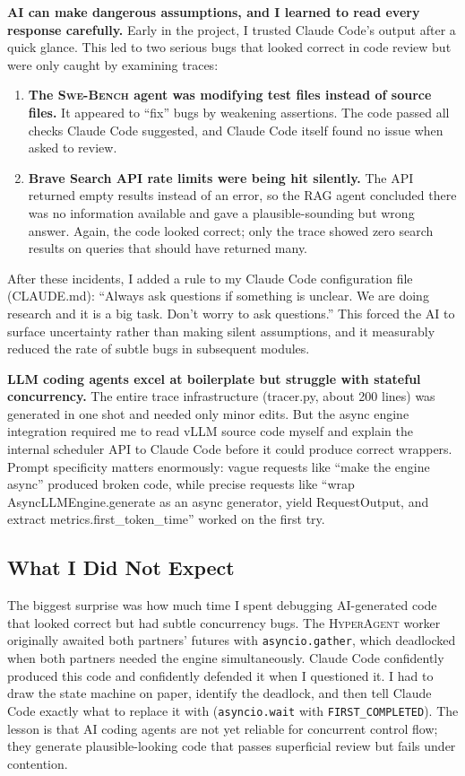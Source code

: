 \documentclass[10pt,twocolumn]{article}
\begin{document}
\textbf{AI can make dangerous assumptions, and I learned to read every response carefully.} Early in the project, I trusted Claude Code's output after a quick glance. This led to two serious bugs that looked correct in code review but were only caught by examining traces:

\begin{enumerate}[nosep,leftmargin=*]
\item \textbf{The \textsc{Swe-Bench} agent was modifying test files instead of source files.} It appeared to ``fix'' bugs by weakening assertions. The code passed all checks Claude Code suggested, and Claude Code itself found no issue when asked to review.
\item \textbf{Brave Search API rate limits were being hit silently.} The API returned empty results instead of an error, so the RAG agent concluded there was no information available and gave a plausible-sounding but wrong answer. Again, the code looked correct; only the trace showed zero search results on queries that should have returned many.
\end{enumerate}

After these incidents, I added a rule to my Claude Code configuration file (CLAUDE.md): ``Always ask questions if something is unclear. We are doing research and it is a big task. Don't worry to ask questions.'' This forced the AI to surface uncertainty rather than making silent assumptions, and it measurably reduced the rate of subtle bugs in subsequent modules.

\textbf{LLM coding agents excel at boilerplate but struggle with stateful concurrency.} The entire trace infrastructure (tracer.py, about 200 lines) was generated in one shot and needed only minor edits. But the async engine integration required me to read vLLM source code myself and explain the internal scheduler API to Claude Code before it could produce correct wrappers. Prompt specificity matters enormously: vague requests like ``make the engine async'' produced broken code, while precise requests like ``wrap AsyncLLMEngine.generate as an async generator, yield RequestOutput, and extract metrics.first\_token\_time'' worked on the first try.

\subsection{What I Did Not Expect}

The biggest surprise was how much time I spent debugging AI-generated code that looked correct but had subtle concurrency bugs. The \textsc{HyperAgent} worker originally awaited both partners' futures with \texttt{asyncio.gather}, which deadlocked when both partners needed the engine simultaneously. Claude Code confidently produced this code and confidently defended it when I questioned it. I had to draw the state machine on paper, identify the deadlock, and then tell Claude Code exactly what to replace it with (\texttt{asyncio.wait} with \texttt{FIRST\_COMPLETED}). The lesson is that AI coding agents are not yet reliable for concurrent control flow; they generate plausible-looking code that passes superficial review but fails under contention.
\end{document}
